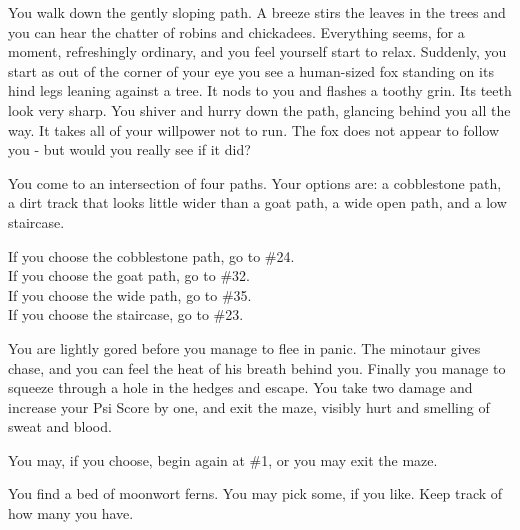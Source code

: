 \documentclass[green]{gl2018}
\begin{document}
\begin{large}
\begin{location}{9}
\end{location}
\begin{location}{10}
You walk down the gently sloping path.  A breeze stirs the leaves in the trees and you can hear the chatter of robins and chickadees.  Everything seems, for a moment, refreshingly ordinary, and you feel yourself start to relax.  Suddenly, you start as out of the corner of your eye you see a human-sized fox standing on its hind legs leaning against a tree.  It nods to you and flashes a toothy grin.  Its teeth look very sharp.  You shiver and hurry down the path, glancing behind you all the way.  It takes all of your willpower not to run.  The fox does not appear to follow you - but would you really see if it did?

You come to an intersection of four paths.  Your options are: a cobblestone path, a dirt track that looks little wider than a goat path, a wide open path, and a low staircase.  

\begin{fromhere}
If you choose the cobblestone path, go to \#24.\\
  If you choose the goat path, go to \#32.\\
  If you choose the wide path, go to \#35.\\
  If you choose the staircase, go to \#23.
\end{fromhere}
\end{location}
\begin{location}{11}
You are lightly gored before you manage to flee in panic.  The minotaur gives chase, and you can feel the heat of his breath behind you.  Finally you manage to squeeze through a hole in the hedges and escape.  You take two damage and increase your Psi Score by one, and exit the maze, visibly hurt and smelling of sweat and blood.  
\begin{fromhere}
You may, if you choose, begin again at \#1, or you may exit the maze.
\end{fromhere}
\end{location}
\begin{location}{12}
You find a bed of moonwort ferns.  You may pick some, if you like.  Keep track of how many you have.


\end{location}
\end{large}
\end{document}
